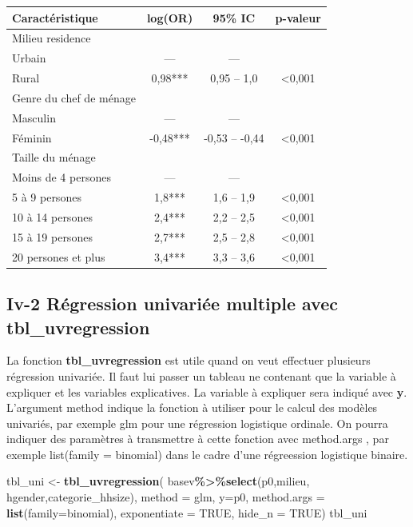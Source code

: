 \documentclass[
]{article}
\newenvironment{Shaded}{\begin{snugshade}}{\end{snugshade}}
\newcommand{\AttributeTok}[1]{\textcolor[rgb]{0.13,0.29,0.53}{#1}}
\newcommand{\ConstantTok}[1]{\textcolor[rgb]{0.56,0.35,0.01}{#1}}
\newcommand{\FunctionTok}[1]{\textcolor[rgb]{0.13,0.29,0.53}{\textbf{#1}}}
\newcommand{\NormalTok}[1]{#1}
\newcommand{\OtherTok}[1]{\textcolor[rgb]{0.56,0.35,0.01}{#1}}
\newcommand{\SpecialCharTok}[1]{\textcolor[rgb]{0.81,0.36,0.00}{\textbf{#1}}}
\begin{document}
\begin{longtable}[]{@{}lccc@{}}
\toprule\noalign{}
\textbf{Caractéristique} & \textbf{log(OR)} & \textbf{95\% IC} &
\textbf{p-valeur} \\
\midrule\noalign{}
\endhead
\bottomrule\noalign{}
\endlastfoot
Milieu residence & & & \\
Urbain & --- & --- & \\
Rural & 0,98*** & 0,95 -- 1,0 & \textless0,001 \\
Genre du chef de ménage & & & \\
Masculin & --- & --- & \\
Féminin & -0,48*** & -0,53 -- -0,44 & \textless0,001 \\
Taille du ménage & & & \\
Moins de 4 persones & --- & --- & \\
5 à 9 persones & 1,8*** & 1,6 -- 1,9 & \textless0,001 \\
10 à 14 persones & 2,4*** & 2,2 -- 2,5 & \textless0,001 \\
15 à 19 persones & 2,7*** & 2,5 -- 2,8 & \textless0,001 \\
20 persones et plus & 3,4*** & 3,3 -- 3,6 & \textless0,001 \\
\end{longtable}

\hypertarget{iv-2-ruxe9gression-univariuxe9e-multiple-avec-tbl_uvregression}{%
\subsection{Iv-2 Régression univariée multiple avec
tbl\_uvregression}\label{iv-2-ruxe9gression-univariuxe9e-multiple-avec-tbl_uvregression}}

La fonction \textbf{tbl\_uvregression} est utile quand on veut effectuer
plusieurs régression univariée. Il faut lui passer un tableau ne
contenant que la variable à expliquer et les variables explicatives. La
variable à expliquer sera indiqué avec \textbf{y}. L'argument method
indique la fonction à utiliser pour le calcul des modèles univariés, par
exemple glm pour une régression logistique ordinale. On pourra indiquer
des paramètres à transmettre à cette fonction avec method.args , par
exemple list(family = binomial) dans le cadre d'une régreession
logistique binaire.

\begin{Shaded}
\begin{Highlighting}[]
\NormalTok{tbl\_uni }\OtherTok{\textless{}{-}} \FunctionTok{tbl\_uvregression}\NormalTok{(}
\NormalTok{  basev}\SpecialCharTok{\%\textgreater{}\%}\FunctionTok{select}\NormalTok{(p0,milieu, hgender,categorie\_hhsize), }
  \AttributeTok{method =}\NormalTok{ glm, }
  \AttributeTok{y=}\NormalTok{p0, }
  \AttributeTok{method.args =} \FunctionTok{list}\NormalTok{(}\AttributeTok{family=}\NormalTok{binomial),}
  \AttributeTok{exponentiate =} \ConstantTok{TRUE}\NormalTok{,}
  \AttributeTok{hide\_n =} \ConstantTok{TRUE}\NormalTok{)}
\NormalTok{tbl\_uni}
\end{Highlighting}
\end{Shaded}
\end{document}
